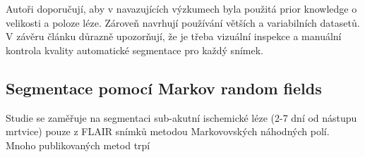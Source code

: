 \documentclass[11pt]{article}
\begin{document}
Autoři doporučují, aby v navazujících výzkumech byla použitá prior knowledge o velikosti a poloze léze. Zároveň navrhují používání větších a variabilních datasetů. V závěru článku důrazně upozorňují, že je třeba vizuální inspekce a manuální kontrola kvality automatické segmentace pro každý snímek.

\subsection{Segmentace pomocí Markov random fields}
Studie \cite{Subbanna2019} se zaměřuje na segmentaci sub-akutní ischemické léze (2-7 dní od nástupu mrtvice) pouze z FLAIR snímků metodou Markovovských náhodných polí. Mnoho publikovaných metod trpí 

%
%

\printbibliography
\end{document}
